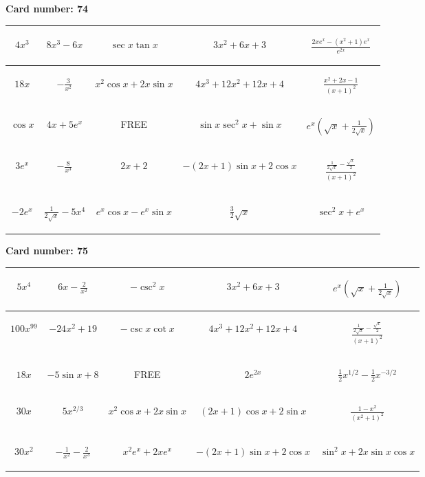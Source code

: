 \documentclass{article}
\newcommand{\entry}[1]{\begin{minipage}[t][2.75cm][t]{4cm} \vspace{1cm} \begin{center}#1\end{center} \end{minipage}}
\newcommand{\freespace}{\entry{FREE}}
\newcommand{\cardnumber}[1]{\noindent \textbf{Card number: #1} \bigskip}
\begin{document}
\pagebreak

\cardnumber{74}
\begin{center}
\begin{tabular}{|*{5}{c|}}
    \hline
    \entry{$4x^3$} & \entry{$8x^3 - 6x$} & \entry{$\sec x \tan x$} & \entry{$3x^2 + 6x + 3$} & \entry{$\frac{2x e^x - (x^2 + 1) e^x}{e^{2x}}$} \\ \hline
    \entry{$18x$} & \entry{$-\frac{3}{x^2}$} & \entry{$x^2 \cos x + 2x \sin x$} & \entry{$4x^3 + 12x^2 + 12x + 4$} & \entry{$\frac{x^2 + 2x - 1}{(x + 1)^2}$} \\ \hline
    \entry{$\cos x$} & \entry{$4x + 5e^x$} & \freespace & \entry{$\sin x \sec^2 x + \sin x$} & \entry{$e^x \left(\sqrt{x} + \frac{1}{2\sqrt{x}}\right)$} \\ \hline
    \entry{$3e^x$} & \entry{$-\frac{8}{x^3}$} & \entry{$2x + 2$} & \entry{$-(2x + 1) \sin x + 2 \cos x$} & \entry{$\frac{\frac{1}{2 \sqrt{x}} - \frac{\sqrt{x}}{2}}{(x + 1)^2}$} \\ \hline
    \entry{$-2e^x$} & \entry{$\frac{1}{2\sqrt{x}} - 5x^4$} & \entry{$e^x \cos x - e^x \sin x$} & \entry{$\frac{3}{2} \sqrt{x}$} & \entry{$\sec^2 x + e^x$} \\ \hline
\end{tabular}
\end{center}

\pagebreak

\cardnumber{75}
\begin{center}
\begin{tabular}{|*{5}{c|}}
    \hline
    \entry{$5x^4$} & \entry{$6x - \frac{2}{x^2}$} & \entry{$-\csc^2 x$} & \entry{$3x^2 + 6x + 3$} & \entry{$e^x \left(\sqrt{x} + \frac{1}{2\sqrt{x}}\right)$} \\ \hline
    \entry{$100x^{99}$} & \entry{$-24x^2 + 19$} & \entry{$-\csc x \cot x$} & \entry{$4x^3 + 12x^2 + 12x + 4$} & \entry{$\frac{\frac{1}{2 \sqrt{x}} - \frac{\sqrt{x}}{2}}{(x + 1)^2}$} \\ \hline
    \entry{$18x$} & \entry{$-5 \sin x + 8$} & \freespace & \entry{$2e^{2x}$} & \entry{$\frac{1}{2} x^{1/2} - \frac{1}{2} x^{-3/2}$} \\ \hline
    \entry{$30x$} & \entry{$5x^{2/3}$} & \entry{$x^2 \cos x + 2x \sin x$} & \entry{$(2x + 1) \cos x + 2 \sin x$} & \entry{$\frac{1 - x^2}{(x^2 + 1)^2}$} \\ \hline
    \entry{$30x^2$} & \entry{$-\frac{1}{x^2} - \frac{2}{x^3}$} & \entry{$x^2 e^x + 2x e^x$} & \entry{$-(2x + 1) \sin x + 2 \cos x$} & \entry{$\sin^2 x + 2x \sin x \cos x$} \\ \hline
\end{tabular}
\end{center}
\end{document}
